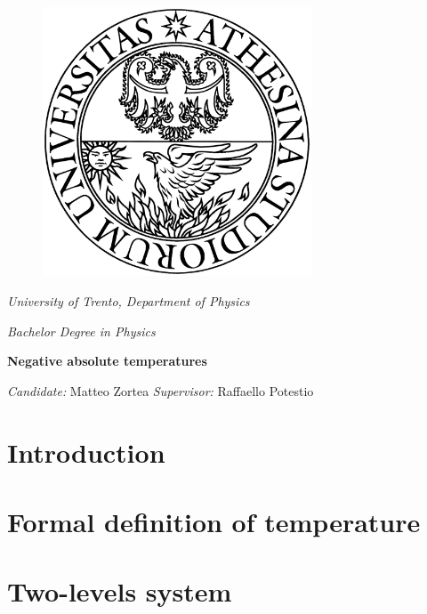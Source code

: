 \documentclass[]{article}
\begin{document}
\begin{titlepage}
    \vfill
    \begin{figure}[h]
        \centering
        \includegraphics[width=8cm]{./images/unitnlogo.png}
        \label{fig:logo}
    \end{figure}
    \vspace{5pt}
    \centerline{\itshape\huge University of Trento, Department of Physics}
    \vspace{10pt}
    \centerline{\emph{\huge Bachelor Degree in Physics}}
    \vspace{100pt}
    \centerline{\bfseries\Huge Negative absolute temperatures}
    \vspace{100pt}
    \centerline{\Large \hspace{100pt} \textit{Candidate:} Matteo Zortea
    \hspace{50pt} \textit{Supervisor:} Raffaello Potestio \hspace{100pt}}
    \vfill
\end{titlepage}

\hypersetup{linkcolor=black}
\tableofcontents
\newpage
\hypersetup{linkcolor=cyan}

\section{Introduction}


\section{Formal definition of temperature}
\label{sec:temperature}


\section{Two-levels system}
\label{sec:TLS}


\printbibliography
\end{document}
